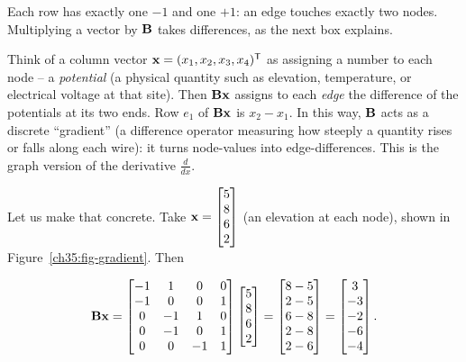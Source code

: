 Each row has exactly one $-1$ and one $+1$: an edge touches exactly two nodes. Multiplying
a vector by $\mathbf{B}$ takes differences, as the next box explains.

\begin{intuitionbox}
Think of a column vector $\mathbf{x} = (x_1,x_2,x_3,x_4)^{\mathsf{T}}$ as assigning a number to each
node -- a \emph{potential} (a physical quantity such as elevation, temperature, or electrical
voltage at that site). Then $\mathbf{B}\mathbf{x}$ assigns to each \emph{edge} the difference of
the potentials at its two ends. Row $e_1$ of $\mathbf{B}\mathbf{x}$ is $x_2 - x_1$. In this
way, $\mathbf{B}$ acts as a discrete ``gradient'' (a difference operator measuring how steeply
a quantity rises or falls along each wire): it turns node-values into edge-differences.
This is the graph version of the derivative $\frac{d}{dx}$.
\end{intuitionbox}

Let us make that concrete. Take $\mathbf{x} = \begin{bmatrix}5\\8\\6\\2\end{bmatrix}$ (an elevation at each node),
shown in Figure~\ref{ch35:fig-gradient}. Then

\[
\mathbf{B}\mathbf{x} =
\begin{bmatrix}
-1&1&0&0\\-1&0&0&1\\0&-1&1&0\\0&-1&0&1\\0&0&-1&1
\end{bmatrix}
\begin{bmatrix}5\\8\\6\\2\end{bmatrix}
=
\begin{bmatrix}8-5\\2-5\\6-8\\2-8\\2-6\end{bmatrix}
=
\begin{bmatrix}3\\-3\\-2\\-6\\-4\end{bmatrix}.
\]

